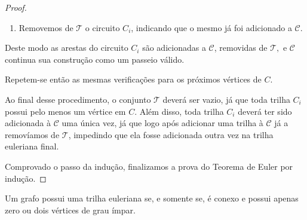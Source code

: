 \begin{proof}
\begin{tcolorbox}
\begin{enumerate}
        \item Removemos de $\mathcal{T}$ o circuito $C_i$, indicando que o mesmo já foi adicionado a $\mathcal{C}$.

\end{enumerate}

Deste modo as arestas do circuito $C_i$ são adicionadas a $\mathcal{C}$, removidas de $\mathcal{T},$ e $\mathcal{C}$ continua sua construção como um passeio válido.

Repetem-se então as mesmas verificações para os próximos vértices de $C$.

\end{tcolorbox}


Ao final desse procedimento, o conjunto $\mathcal{T}$ deverá ser vazio, já que toda trilha $C_i$ possui pelo menos um vértice em $C$. Além disso, toda trilha $C_i$ deverá ter sido adicionada à $\mathcal{C}$ uma única vez, já que logo após adicionar uma trilha à $\mathcal{C}$ já a removíamos de $\mathcal{T}$, impedindo que ela fosse adicionada outra vez na trilha euleriana final.

Comprovado o passo da indução, finalizamos a prova do Teorema de Euler por indução.

\end{proof}

\begin{corollary}
    Um grafo possui uma trilha euleriana se, e somente se, é conexo e possui apenas zero ou dois vértices de grau ímpar.
\end{corollary}

